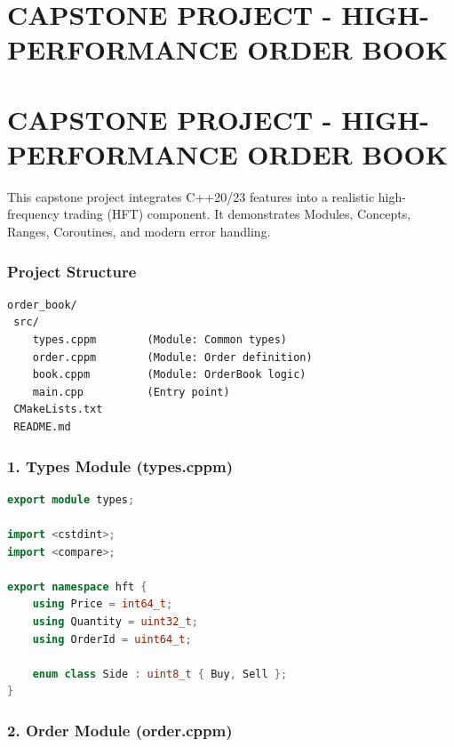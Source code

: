 \hypertarget{capstone-project---high-performance-order-book}{%
\chapter{CAPSTONE PROJECT - HIGH-PERFORMANCE ORDER
BOOK}\label{capstone-project---high-performance-order-book}}

\hypertarget{capstone-project---high-performance-order-book-1}{%
\chapter{CAPSTONE PROJECT - HIGH-PERFORMANCE ORDER
BOOK}\label{capstone-project---high-performance-order-book-1}}

This capstone project integrates C++20/23 features into a realistic
high-frequency trading (HFT) component. It demonstrates Modules,
Concepts, Ranges, Coroutines, and modern error handling.

\hypertarget{project-structure}{%
\subsection{Project Structure}\label{project-structure}}

\begin{lstlisting}
order_book/
 src/
    types.cppm        (Module: Common types)
    order.cppm        (Module: Order definition)
    book.cppm         (Module: OrderBook logic)
    main.cpp          (Entry point)
 CMakeLists.txt
 README.md
\end{lstlisting}

\hypertarget{types-module-types.cppm}{%
\subsection{1. Types Module
(types.cppm)}\label{types-module-types.cppm}}

\begin{lstlisting}[language={C++}]
export module types;

import <cstdint>;
import <compare>;

export namespace hft {
    using Price = int64_t;
    using Quantity = uint32_t;
    using OrderId = uint64_t;

    enum class Side : uint8_t { Buy, Sell };
}
\end{lstlisting}

\hypertarget{order-module-order.cppm}{%
\subsection{2. Order Module
(order.cppm)}\label{order-module-order.cppm}}

